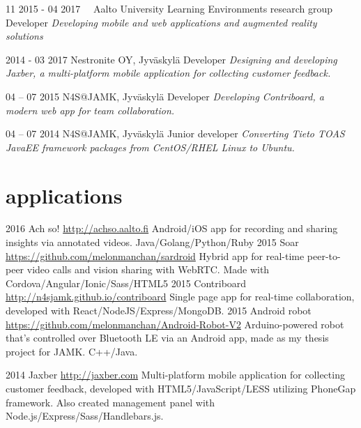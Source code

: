 \documentclass[]{friggeri-cv}
\begin{document}
\begin{entrylist}
  \entry
    {11 2015 - 04 2017~~}
    {Aalto University Learning Environments research group}
    {Developer}
    {\emph{Developing mobile and web applications and augmented reality solutions}}

  \entry
    {2014 - 03 2017}
    {Nestronite OY, Jyväskylä}
    {Developer}
    {\emph{Designing and developing Jaxber, a multi-platform mobile application for collecting customer feedback.}}
    
    \entry
    {04 – 07 2015}
    {N4S@JAMK, Jyväskylä}
    {Developer}
    {\emph{Developing Contriboard, a modern web app for team collaboration.}}
  
  \entry
    {04 – 07 2014}
    {N4S@JAMK, Jyväskylä}
    {Junior developer}
    {\emph{Converting Tieto TOAS JavaEE framework packages from CentOS/RHEL Linux to Ubuntu.}}
    
\end{entrylist}

\section{applications}

\begin{entrylist}
  \entry
    {2016}
    {Ach so!}
    {\href{http://achso.aalto.fi}{http://achso.aalto.fi}}
    {Android/iOS app for recording and sharing insights via annotated videos. Java/Golang/Python/Ruby}
  \entry
    {2015}
    {Soar}
    {\href{https://github.com/melonmanchan/sardroid}{https://github.com/melonmanchan/sardroid}}
    {Hybrid app for real-time peer-to-peer video calls and vision sharing with WebRTC. Made with Cordova/Angular/Ionic/Sass/HTML5}
  \entry
    {2015}
    {Contriboard}
    {\href{http://n4sjamk.github.io/contriboard/}{http://n4sjamk.github.io/contriboard}}
    {Single page app for real-time collaboration, developed with React/NodeJS/Express/MongoDB.}
  \entry
    {2015}
    {Android robot}
    {\href{https://github.com/melonmanchan/Android-Robot-V2}{https://github.com/melonmanchan/Android-Robot-V2}}
    {Arduino-powered robot that's controlled over Bluetooth LE via an Android app, made as my thesis project for JAMK. C++/Java.}

  \entry
    {2014}
    {Jaxber}
    {\href{http://jaxber.com}{http://jaxber.com}}
    {Multi-platform mobile application for collecting customer feedback, developed with HTML5/JavaScript/LESS utilizing PhoneGap framework. Also created management panel with Node.js/Express/Sass/Handlebars.js.}
\end{entrylist}
\end{document}
